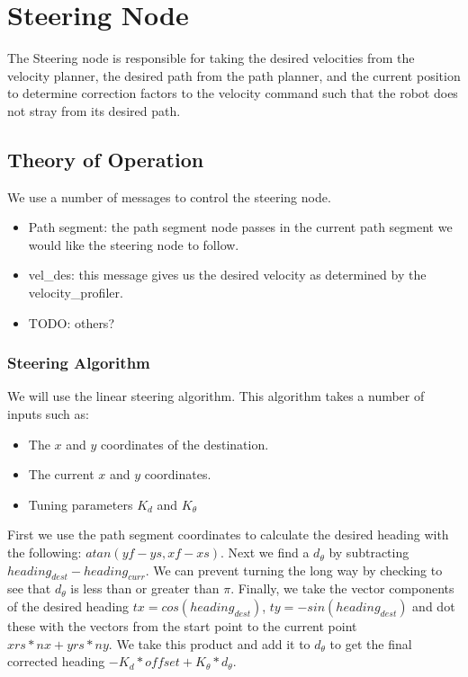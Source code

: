 \section{Steering Node}

The Steering node is responsible for taking the desired velocities from
the velocity planner, the desired path from the path planner, and the
current position to determine correction factors to the velocity command
such that the robot does not stray from its desired path.

\subsection{Theory of Operation}

We use a number of messages to control the steering node.

\begin{itemize}
\item
  Path segment: the path segment node passes in the current path segment
  we would like the steering node to follow.
\item
  vel\_des: this message gives us the desired velocity as determined by
  the velocity\_profiler.
\item
  TODO: others?
\end{itemize}
\subsubsection{Steering Algorithm}

We will use the linear steering algorithm. This algorithm takes a number
of inputs such as:

\begin{itemize}
\item
  The $x$ and $y$ coordinates of the destination.
\item
  The current $x$ and $y$ coordinates.
\item
  Tuning parameters $K_d$ and $K_\theta$
\end{itemize}
First we use the path segment coordinates to calculate the desired
heading with the following: $atan(yf-ys,xf-xs)$. Next we find a
$d_\theta$ by subtracting $heading_{dest}-heading_{curr}$. We can
prevent turning the long way by checking to see that $d_\theta$ is less
than or greater than $\pi$. Finally, we take the vector components of
the desired heading $tx=cos(heading_{dest})$, $ty=-sin(heading_{dest})$
and dot these with the vectors from the start point to the current point
$xrs*nx+yrs*ny$. We take this product and add it to $d_\theta$ to get
the final corrected heading $-K_d*offset+K_{\theta}*d_\theta$.

